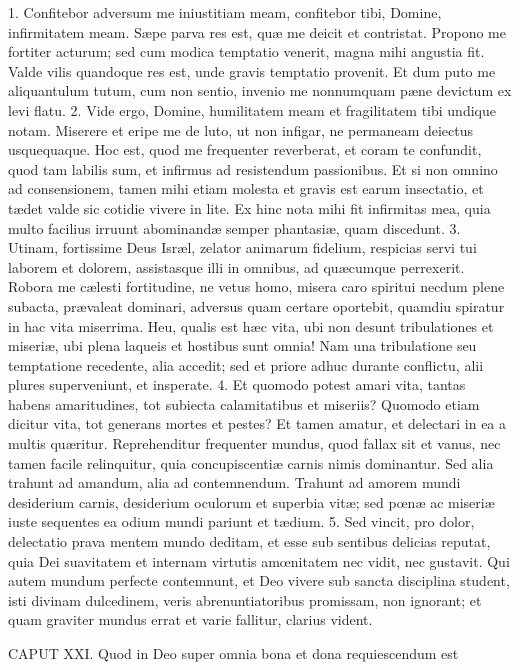\documentclass[twoside]{article}
\begin{document}
1. Confitebor adversum me iniustitiam meam, confitebor tibi, Domine, infirmitatem meam. Sæpe parva res est, quæ me deicit et contristat. Propono me fortiter acturum; sed cum modica temptatio venerit, magna mihi angustia fit. Valde vilis quandoque res est, unde gravis temptatio provenit. Et dum puto me aliquantulum tutum, cum non sentio, invenio me nonnumquam pæne devictum ex levi flatu.
2. Vide ergo, Domine, humilitatem meam et fragilitatem tibi undique notam. Miserere et eripe me de luto, ut non infigar, ne permaneam deiectus usquequaque. Hoc est, quod me frequenter reverberat, et coram te confundit, quod tam labilis sum, et infirmus ad resistendum passionibus. Et si non omnino ad consensionem, tamen mihi etiam molesta et gravis est earum insectatio, et tædet valde sic cotidie vivere in lite. Ex hinc nota mihi fit infirmitas mea, quia multo facilius irruunt abominandæ semper phantasiæ, quam discedunt.
3. Utinam, fortissime Deus Isræl, zelator animarum fidelium, respicias servi tui laborem et dolorem, assistasque illi in omnibus, ad quæcumque perrexerit. Robora me cælesti fortitudine, ne vetus homo, misera caro spiritui necdum plene subacta, prævaleat dominari, adversus quam certare oportebit, quamdiu spiratur in hac vita miserrima. Heu, qualis est hæc vita, ubi non desunt tribulationes et miseriæ, ubi plena laqueis et hostibus sunt omnia! Nam una tribulatione seu temptatione recedente, alia accedit; sed et priore adhuc durante conflictu, alii plures superveniunt, et insperate.
4. Et quomodo potest amari vita, tantas habens amaritudines, tot subiecta calamitatibus et miseriis? Quomodo etiam dicitur vita, tot generans mortes et pestes? Et tamen amatur, et delectari in ea a multis quæritur. Reprehenditur frequenter mundus, quod fallax sit et vanus, nec tamen facile relinquitur, quia concupiscentiæ carnis nimis dominantur. Sed alia trahunt ad amandum, alia ad contemnendum. Trahunt ad amorem mundi desiderium carnis, desiderium oculorum et superbia vitæ; sed pœnæ ac miseriæ iuste sequentes ea odium mundi pariunt et tædium.
5. Sed vincit, pro dolor, delectatio prava mentem mundo deditam, et esse sub sentibus delicias reputat, quia Dei suavitatem et internam virtutis amœnitatem nec vidit, nec gustavit. Qui autem mundum perfecte contemnunt, et Deo vivere sub sancta disciplina student, isti divinam dulcedinem, veris abrenuntiatoribus promissam, non ignorant; et quam graviter mundus errat et varie fallitur, clarius vident.


CAPUT XXI.
Quod in Deo super omnia bona et dona requiescendum est
\end{document}
